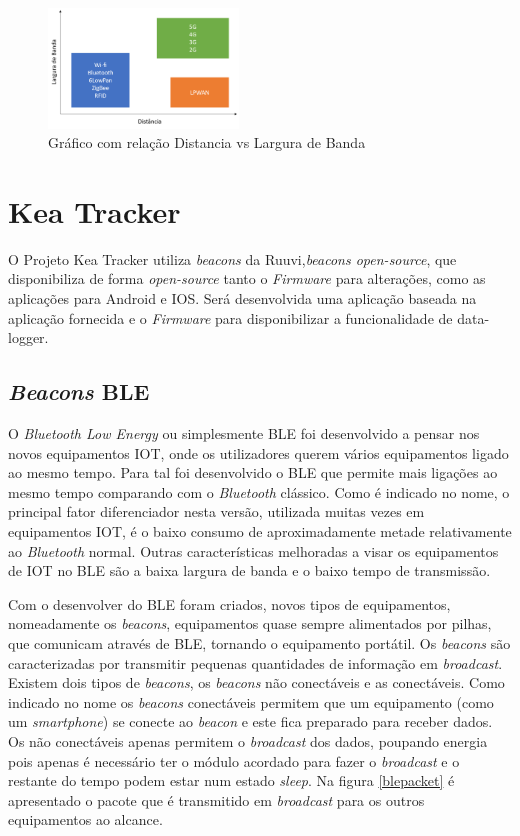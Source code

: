\begin{figure}[ht]
\centering
\includegraphics[width=0.45\textwidth]{images/lpwan.png}
\caption{Gráfico com relação Distancia vs Largura de Banda\cite{masterthesisLPWAN}}\label{figgraphlpwan}
\end{figure}



\section {Kea Tracker}\label{kea}
O Projeto Kea Tracker utiliza \textit{beacons} da Ruuvi,\textit{beacons open-source}\cite{ruuvi}, que disponibiliza de forma \textit{open-source} tanto o \textit{Firmware} para alterações, como as aplicações para Android e IOS. Será desenvolvida uma aplicação baseada na aplicação fornecida e o \textit{Firmware} para disponibilizar a funcionalidade de data-logger.
\subsection{\textit{Beacons} BLE}
\par
O \textit{Bluetooth Low Energy} ou simplesmente BLE foi desenvolvido a pensar nos novos equipamentos IOT, onde os utilizadores querem vários equipamentos ligado ao mesmo tempo. Para tal foi desenvolvido o BLE que permite mais ligações ao mesmo tempo comparando com o \textit{Bluetooth} clássico.
Como é indicado no nome, o principal fator diferenciador nesta versão, utilizada muitas vezes em equipamentos IOT, é o baixo consumo de aproximadamente metade relativamente ao \textit{Bluetooth} normal. Outras características melhoradas a visar os equipamentos de IOT no BLE são a baixa largura de banda e o baixo tempo de transmissão.

Com o desenvolver do BLE foram criados, novos tipos de equipamentos, nomeadamente os \textit{beacons}, equipamentos quase sempre alimentados por pilhas, que comunicam através de BLE, tornando o equipamento portátil. Os \textit{beacons} são caracterizadas por transmitir pequenas quantidades de informação em \textit{broadcast}.
Existem dois tipos de \textit{beacons}, os \textit{beacons} não conectáveis e as conectáveis\cite{blepacket}. Como indicado no nome os \textit{beacons} conectáveis permitem que um equipamento (como um \textit{smartphone}) se conecte ao \textit{beacon} e este fica preparado para receber dados. Os não conectáveis apenas permitem o \textit{broadcast}  dos dados, poupando energia pois apenas é necessário ter o módulo acordado para fazer o \textit{broadcast} e o restante do tempo podem estar num estado \textit{sleep}. Na figura \ref{blepacket} é apresentado o pacote que é transmitido em \textit{broadcast} para os outros equipamentos ao alcance.

